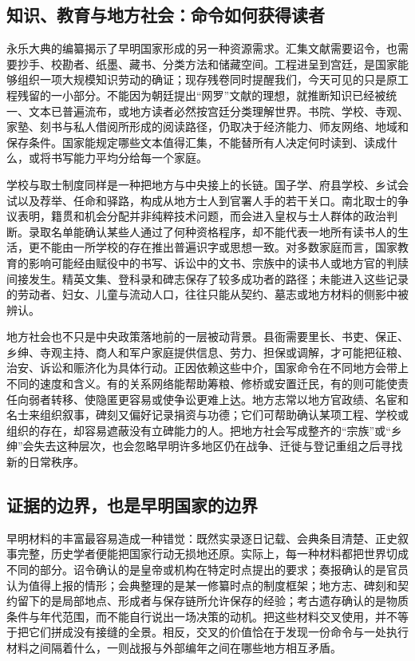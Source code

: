 \subsection{知识、教育与地方社会：命令如何获得读者}

永乐大典的编纂揭示了早明国家形成的另一种资源需求。汇集文献需要诏令，也需要抄手、校勘者、纸墨、藏书、分类方法和储藏空间。工程进呈到宫廷，是国家能够组织一项大规模知识劳动的确证；现存残卷同时提醒我们，今天可见的只是原工程残留的一小部分。不能因为朝廷提出“网罗”文献的理想，就推断知识已经被统一、文本已普遍流布，或地方读者必然按宫廷分类理解世界。书院、学校、寺观、家塾、刻书与私人借阅所形成的阅读路径，仍取决于经济能力、师友网络、地域和保存条件。国家能规定哪些文本值得汇集，不能替所有人决定何时读到、读成什么，或将书写能力平均分给每一个家庭。

学校与取士制度同样是一种把地方与中央接上的长链。国子学、府县学校、乡试会试以及荐举、任命和驿路，构成从地方士人到官署人手的若干关口。南北取士的争议表明，籍贯和机会分配并非纯粹技术问题，而会进入皇权与士人群体的政治判断。录取名单能确认某些人通过了何种资格程序，却不能代表一地所有读书人的生活，更不能由一所学校的存在推出普遍识字或思想一致。对多数家庭而言，国家教育的影响可能经由赋役中的书写、诉讼中的文书、宗族中的读书人或地方官的判牍间接发生。精英文集、登科录和碑志保存了较多成功者的路径；未能进入这些记录的劳动者、妇女、儿童与流动人口，往往只能从契约、墓志或地方材料的侧影中被辨认。

地方社会也不只是中央政策落地前的一层被动背景。县衙需要里长、书吏、保正、乡绅、寺观主持、商人和军户家庭提供信息、劳力、担保或调解，才可能把征粮、治安、诉讼和赈济化为具体行动。正因依赖这些中介，国家命令在不同地方会带上不同的速度和含义。有的关系网络能帮助筹粮、修桥或安置迁民，有的则可能使责任向弱者转移、使隐匿更容易或使争讼更难上达。地方志常以地方官政绩、名宦和名士来组织叙事，碑刻又偏好记录捐资与功德；它们可帮助确认某项工程、学校或组织的存在，却容易遮蔽没有立碑能力的人。把地方社会写成整齐的“宗族”或“乡绅”会失去这种层次，也会忽略早明许多地区仍在战争、迁徙与登记重组之后寻找新的日常秩序。

\subsection{证据的边界，也是早明国家的边界}

早明材料的丰富最容易造成一种错觉：既然实录逐日记载、会典条目清楚、正史叙事完整，历史学者便能把国家行动无损地还原。实际上，每一种材料都把世界切成不同的部分。诏令确认的是皇帝或机构在特定时点提出的要求；奏报确认的是官员认为值得上报的情形；会典整理的是某一修纂时点的制度框架；地方志、碑刻和契约留下的是局部地点、形成者与保存链所允许保存的经验；考古遗存确认的是物质条件与年代范围，而不能自行说出一场决策的动机。把这些材料交叉使用，并不等于把它们拼成没有接缝的全景。相反，交叉的价值恰在于发现一份命令与一处执行材料之间隔着什么，一则战报与外部编年之间在哪些地方相互矛盾。

